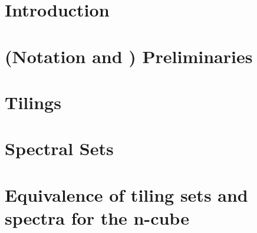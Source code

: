 \documentclass[british, oneside]{ntnuthesis}
\begin{document}
    



    \chapter{Introduction}
        

    \chapter{(Notation and ) Preliminaries}
        
    
    \chapter{Tilings}\label{chap:tiling}
        

    \chapter{Spectral Sets}
        
    
    \chapter{Equivalence of tiling sets and spectra for the n-cube}\label{chap:equivalence}
        


    \printbibliography
\end{document}
